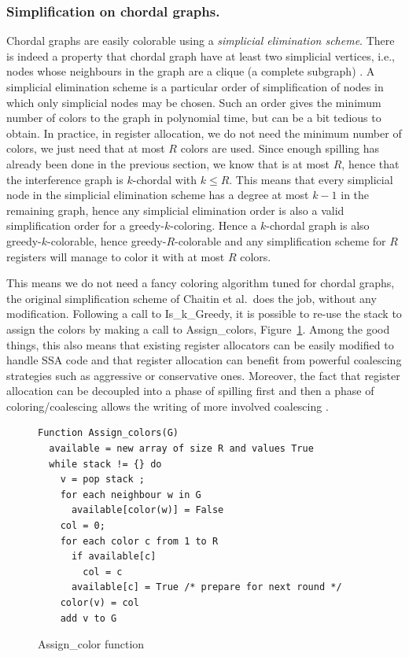 {\subsubsection{Simplification on chordal graphs.}

Chordal graphs are easily colorable using a \emph{simplicial elimination 
scheme}. There is indeed a property that chordal graph have at least two 
simplicial vertices, i.e., nodes whose neighbours in the graph are a clique (a 
complete subgraph) .  
A simplicial elimination scheme is a particular order of simplification of 
nodes in which only simplicial nodes may be chosen. Such an order gives the 
minimum number of colors to the graph in polynomial time, but can be a bit 
tedious to obtain. In practice, in register allocation, we do not need the 
minimum number of colors, we just need that at most $R$ colors are used. Since 
enough spilling has already been done in the previous section, we know that 
\maxlive is at most $R$, hence that the interference graph is $k$-chordal with 
$k\leq R$. This means that every simplicial node in the simplicial elimination 
scheme has a degree at most $k-1$ in the remaining graph, hence any simplicial 
elimination order is also a valid simplification order for a 
greedy-$k$-coloring. Hence a $k$-chordal graph is also greedy-$k$-colorable, 
hence greedy-$R$-colorable and any simplification scheme for $R$ registers will 
manage to color it with at most $R$ colors.


This means we do not need a fancy coloring algorithm tuned for chordal graphs, 
the original simplification scheme of Chaitin et al.\ does the job, without any 
modification. Following a call to Is\_k\_Greedy, it is possible to re-use the 
stack to assign the colors by making a call to Assign\_colors, 
Figure~\ref{code:assign-color}. Among the good things, this also means that 
existing register allocators can be easily modified to handle SSA code and that 
register allocation can benefit from powerful coalescing strategies such as 
aggressive or conservative ones. Moreover, the fact that register allocation 
can be decoupled into a phase of spilling first and then a phase of 
coloring/coalescing allows the writing of more involved coalescing .


\begin{figure}
\begin{verbatim}
Function Assign_colors(G)
  available = new array of size R and values True
  while stack != {} do
    v = pop stack ;
    for each neighbour w in G
      available[color(w)] = False
    col = 0;
    for each color c from 1 to R
      if available[c]
        col = c
      available[c] = True /* prepare for next round */
    color(v) = col
    add v to G
\end{verbatim}
\caption{Assign\_color function}
\label{code:assign-color}
\end{figure}





}
